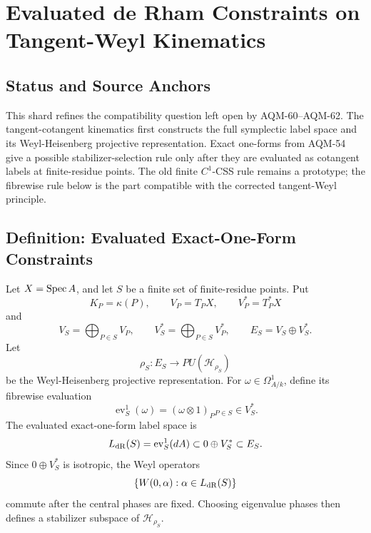 
\section{Evaluated de Rham Constraints on Tangent-Weyl Kinematics}
\label{sec:evaluated-derham-constraints-tangent-weyl}

\subsection{Status and Source Anchors}

This shard refines the compatibility question left open by AQM-60--AQM-62.
The tangent-cotangent kinematics first constructs the full symplectic label
space and its Weyl-Heisenberg projective representation.  Exact one-forms from
AQM-54 give a possible stabilizer-selection rule only after they are evaluated
as cotangent labels at finite-residue points.  The old finite \(C^1\)-CSS rule
remains a prototype; the fibrewise rule below is the part compatible with the
corrected tangent-Weyl principle.

\subsection{Definition: Evaluated Exact-One-Form Constraints}

Let \(X=\operatorname{Spec} A\), and let \(S\) be a finite set of finite-residue points.  Put
\[
  K_P=\kappa(P),\qquad V_P=T_PX,\qquad V_P^*=T_P^*X
\]
and
\[
  V_S=\bigoplus_{P\in S}V_P,\qquad
  V_S^*=\bigoplus_{P\in S}V_P^*,\qquad
  E_S=V_S\oplus V_S^*.
\]
Let
\[
  \rho_S:E_S\to PU(\mathcal H_{\rho_S})
\]
be the Weyl-Heisenberg projective representation.  For
\(\omega\in\Omega^1_{A/k}\), define its fibrewise evaluation
\[
  \operatorname{ev}^1_S(\omega)=
  (\omega\otimes1)_P{}_{P\in S}\in V_S^*.
\]
The evaluated exact-one-form label space is
\[
  L_{\rm dR}(S)=\operatorname{ev}^1_S(dA)\subset 0\oplus V_S^*\subset E_S.
\]
Since \(0\oplus V_S^*\) is isotropic, the Weyl operators
\[
  \{W(0,\alpha):\alpha\in L_{\rm dR}(S)\}
\]
commute after the central phases are fixed.  Choosing eigenvalue phases then
defines a stabilizer subspace of \(\mathcal H_{\rho_S}\).

